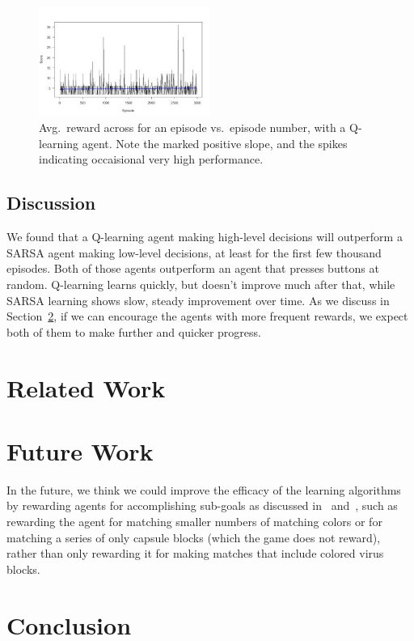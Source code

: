 \documentclass[letterpaper]{article} %
\begin{document}
\begin{figure}
\includegraphics[width=0.5\textwidth]{q-learning-results.png}
\caption{Avg.~reward across for an episode vs.~episode number, with a Q-learning agent. Note the marked positive slope, and the spikes indicating occaisional very high performance.}\label{fig:q-results}
\end{figure}


\subsection{Discussion}
We found that a Q-learning agent making high-level decisions will outperform a SARSA agent making low-level decisions, at least for the first few thousand episodes. Both of those agents outperform an agent that presses buttons at random. Q-learning learns quickly, but doesn't improve much after that, while SARSA learning shows slow, steady improvement over time. As we discuss in Section~\ref{sec:future-work}, if we can encourage the agents with more frequent rewards, we expect both of them to make further and quicker progress.

\section{Related Work}

\section{Future Work}\label{sec:future-work}
In the future, we think we could improve the efficacy of the learning algorithms by rewarding agents for accomplishing sub-goals as discussed in~\cite{banzas15} and~\cite{bhonker17}, such as rewarding the agent for matching smaller numbers of matching colors or for matching a series of only capsule blocks (which the game does not reward), rather than only rewarding it for making matches that include colored virus blocks.

\section{Conclusion}

\newpage


\end{document}
